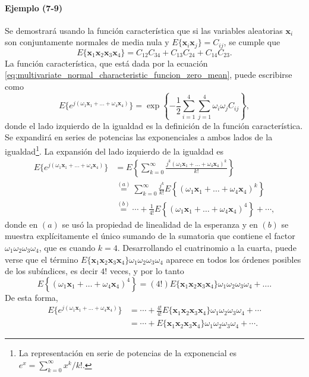 \documentclass[a4paper]{report}
\newcommand{\x}{\mathbf{x}}
\begin{document}
\paragraph{Ejemplo (7-9)} Se demostrará usando la función característica que si las variables aleatorias \(\x_i\) son conjuntamente normales de media nula y \(E\{\x_i\x_j\}=C_{ij}\), se cumple que
\begin{equation}\label{eq:normal_x1x2x3x4_expected_value}
 E\{\x_1\x_2\x_3\x_4\}=C_{12}C_{34}+C_{13}C_{24}+C_{14}C_{23}.
\end{equation}
La función característica, que está dada por la ecuación \ref{eq:multivariate_normal_characteristic_funcion_zero_mean}, puede escribirse como
\begin{equation}\label{eq:normal_x1x2x3x4_expected_value_tmp1}
 E\{e^{j(\omega_1\x_1+\dots+\omega_4\x_4)}\}=\exp\left\{-\frac{1}{2}\sum_{i=1}^4\sum_{j=1}^4\omega_i\omega_jC_{ij}\right\},
\end{equation}
donde el lado izquierdo de la igualdad es la definición de la función característica. Se expandirá en series de potencias las exponenciales a ambos lados de la igualdad\footnote{La representación en serie de potencias de la exponencial es  \(e^x=\sum_{k=0}^{\infty} x^{k}/k!.\)}. La expansión del lado izquierdo de la igualdad es
\begin{align*}
 E\{e^{j(\omega_1\x_1+\dots+\omega_4\x_4)}\}&=E\left\{\sum_{k=0}^{\infty} \frac{j^{k}(\omega_1\x_1+\dots+\omega_4\x_4)^{k}}{k!}\right\}\\
  &\overset{(a)}{=}\sum_{k=0}^{\infty}\frac{j^{k}}{k!}E\left\{(\omega_1\x_1+\dots+\omega_4\x_4)^{k}\right\}\\
  &\overset{(b)}{=}\cdots+\frac{1}{4!}E\left\{(\omega_1\x_1+\dots+\omega_4\x_4)^{4}\right\}+\cdots,
\end{align*}
donde en \((a)\) se usó la propiedad de linealidad de la esperanza y en \((b)\) se muestra explícitamente el único sumando de la sumatoria que contiene el factor \(\omega_1\omega_2\omega_3\omega_4\), que es cuando  \(k=4\). Desarrollando el cuatrinomio a la cuarta, puede verse que el término \(E\{\x_1\x_2\x_3\x_4\}\omega_1\omega_2\omega_3\omega_4\) aparece en todos los órdenes posibles de los subíndices, es decir \(4!\) veces, y por lo tanto
\[
 E\left\{(\omega_1\x_1+\dots+\omega_4\x_4)^{4}\right\}=(4!)E\{\x_1\x_2\x_3\x_4\}\omega_1\omega_2\omega_3\omega_4+\dots.
\]
De esta forma,
\begin{align}\label{eq:normal_x1x2x3x4_expected_value_tmp3}
 E\{e^{j(\omega_1\x_1+\dots+\omega_4\x_4)}\}&=\cdots+\frac{4!}{4!}E\{\x_1\x_2\x_3\x_4\}\omega_1\omega_2\omega_3\omega_4+\cdots\nonumber\\
  &=\cdots+E\{\x_1\x_2\x_3\x_4\}\omega_1\omega_2\omega_3\omega_4+\cdots.
\end{align}
\end{document}
